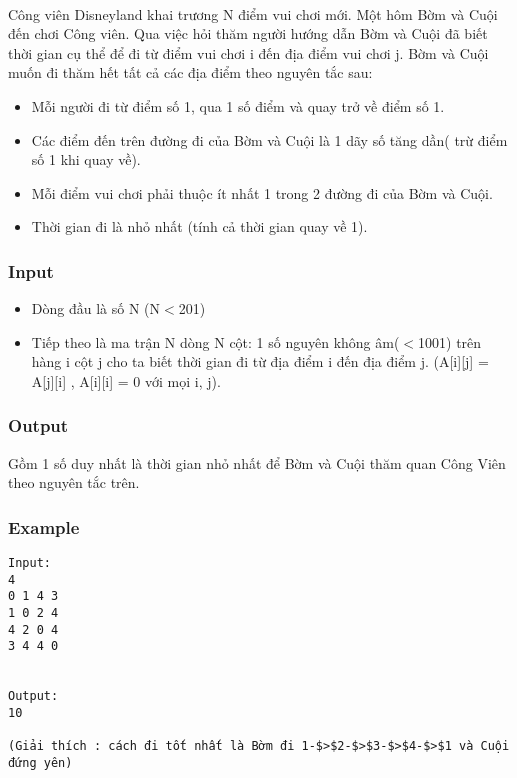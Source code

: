 

 

Công viên Disneyland khai trương N điểm vui chơi mới. Một hôm Bờm và Cuội đến chơi Công viên. Qua việc hỏi thăm người hướng dẫn Bờm và Cuội đã biết thời gian cụ thể để đi từ điểm vui chơi i đến địa điểm vui chơi j. Bờm và Cuội muốn đi thăm hết tất cả các địa điểm theo nguyên tắc sau:
\begin{itemize}
	\item Mỗi người đi từ điểm số 1, qua 1 số điểm và quay trở về điểm số 1.
	\item Các điểm đến trên đường đi của Bờm và Cuội là 1 dãy số tăng dần( trừ điểm số 1 khi quay về).
	\item Mỗi điểm vui chơi phải thuộc ít nhất 1 trong 2 đường đi của Bờm và Cuội.
	\item Thời gian đi là nhỏ nhất (tính cả thời gian quay về 1).
\end{itemize}

\subsubsection{Input}
\begin{itemize}
	\item Dòng đầu là số N (N$<$201)
	\item Tiếp theo là ma trận N dòng N cột: 1 số nguyên không âm($<$1001) trên hàng i cột j cho ta biết thời gian đi từ địa điểm i đến địa điểm j. (A[i][j] = A[j][i] , A[i][i] = 0 với mọi i, j).
\end{itemize}

\subsubsection{Output}

Gồm 1 số duy nhất là thời gian nhỏ nhất để Bờm và Cuội thăm quan Công Viên theo nguyên tắc trên.

\subsubsection{Example}
\begin{verbatim}
Input:
4
0 1 4 3
1 0 2 4
4 2 0 4
3 4 4 0


Output:
10

(Giải thích : cách đi tốt nhất là Bờm đi 1-$>$2-$>$3-$>$4-$>$1 và Cuội đứng yên)
\end{verbatim}